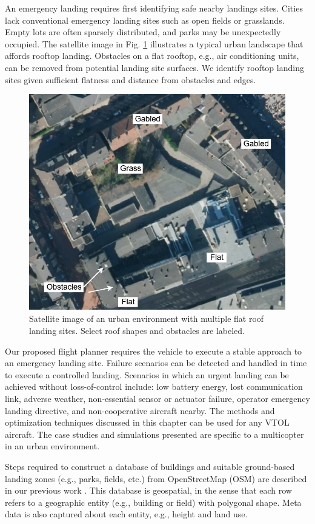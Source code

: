 An emergency landing requires first identifying safe nearby landings sites.  Cities lack conventional emergency landing sites such as open fields or grasslands. Empty lots are often sparsely distributed, and parks may be unexpectedly occupied.  The satellite image in Fig. \ref{fig:ch5_challenge_urban} illustrates a typical urban landscape that affords rooftop landing. Obstacles on a flat rooftop, e.g., air conditioning units, can be removed from potential landing site surfaces. We identify rooftop landing sites given sufficient flatness and distance from obstacles and edges. 

\begin{figure}[ht]
    \centering
    \includegraphics[clip, trim=0.0cm 0cm 0cm 0cm, width=0.45\linewidth]{chapter_5_mapping/imgs/challenge_urban-Page-2.jpg}
    \caption[Satellite image of an urban environment with multiple flat roof landing sites]{Satellite image of an urban environment with multiple flat roof landing sites. Select roof shapes and obstacles are labeled.}
    \label{fig:ch5_challenge_urban}
\end{figure}

Our proposed flight planner requires the vehicle to execute a stable approach to an emergency landing site.  Failure scenarios can be detected and handled in time to execute a controlled landing. Scenarios in which an urgent landing can be achieved without loss-of-control include: low battery energy, lost communication link, adverse weather, non-essential sensor or actuator failure, operator emergency landing directive, and non-cooperative aircraft nearby.  The methods and optimization techniques discussed in this chapter can be used for any VTOL aircraft. The case studies and simulations presented are specific to a multicopter in an urban environment.

Steps required to construct a database of buildings and suitable ground-based landing zones (e.g., parks, fields, etc.) from  OpenStreetMap (OSM) are described in our previous work \cite{castagno_comprehensive_2018}.  This database is geospatial, in the sense that each row refers to a geographic entity (e.g., building or field) with polygonal shape. Meta data is also captured about each entity, e.g., height and land use. 

